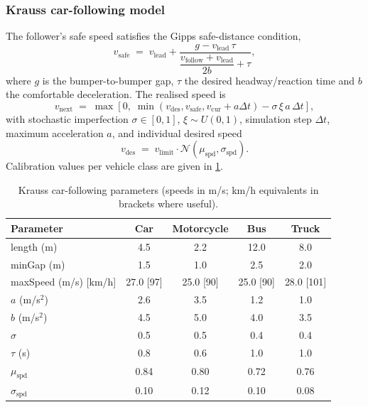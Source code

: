 \documentclass[11pt,a4paper]{article}
\begin{document}
\subsubsection{Krauss car-following model}
The follower's safe speed satisfies the Gipps safe-distance condition,
\begin{equation}
v_{\text{safe}} \;=\; v_{\text{lead}} + \frac{g - v_{\text{lead}}\,\tau}{\dfrac{v_{\text{follow}}+v_{\text{lead}}}{2b} + \tau},
\label{eq:vsafe}
\end{equation}
where $g$ is the bumper-to-bumper gap, $\tau$ the desired headway/reaction time and $b$ the comfortable deceleration. The realised speed is
\begin{equation}
v_{\text{next}} \;=\; \max\!\left[0,\;\min(v_{\text{des}}, v_{\text{safe}}, v_{\text{cur}}+a\Delta t) - \sigma\,\xi\,a\,\Delta t\right],
\label{eq:vnext}
\end{equation}
with stochastic imperfection $\sigma\in[0,1]$, $\xi\sim U(0,1)$, simulation step $\Delta t$, maximum acceleration $a$, and individual desired speed
\begin{equation}
v_{\text{des}} \;=\; v_{\text{limit}}\cdot\mathcal{N}(\mu_{\text{spd}},\sigma_{\text{spd}}).
\label{eq:vdes}
\end{equation}
Calibration values per vehicle class are given in \cref{tab:krauss}.

\begin{table}[H]
\centering
\caption{Krauss car-following parameters (speeds in m/s; km/h equivalents in brackets where useful).}
\label{tab:krauss}
\begin{tabular}{lcccc}
\toprule
\textbf{Parameter} & \textbf{Car} & \textbf{Motorcycle} & \textbf{Bus} & \textbf{Truck} \\ \midrule
length (m)         & 4.5 & 2.2 & 12.0 & 8.0 \\
minGap (m)         & 1.5 & 1.0 & 2.5  & 2.0 \\
maxSpeed (m/s) [km/h] & 27.0 [97] & 25.0 [90] & 25.0 [90] & 28.0 [101] \\
$a$ (m/s$^2$)      & 2.6 & 3.5 & 1.2 & 1.0 \\
$b$ (m/s$^2$)      & 4.5 & 5.0 & 4.0 & 3.5 \\
$\sigma$           & 0.5 & 0.5 & 0.4 & 0.4 \\
$\tau$ (s)         & 0.8 & 0.6 & 1.0 & 1.0 \\
$\mu_{\text{spd}}$ & 0.84 & 0.80 & 0.72 & 0.76 \\
$\sigma_{\text{spd}}$ & 0.10 & 0.12 & 0.10 & 0.08 \\
\bottomrule
\end{tabular}
\end{table}
\end{document}
